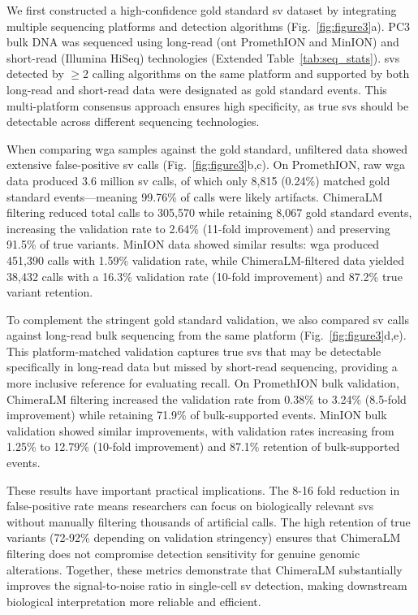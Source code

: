 \documentclass[pdflatex,sn-nature,lineno]{sn-jnl}%
\theoremstyle{thmstyleone}%
\theoremstyle{thmstyletwo}%
\theoremstyle{thmstylethree}%
\begin{document}
We first constructed a high-confidence gold standard \gls{sv} dataset by integrating multiple sequencing platforms and detection algorithms (Fig.~\ref{fig:figure3}a).
PC3 bulk DNA was sequenced using long-read (\gls{ont} PromethION and MinION) and short-read (Illumina HiSeq) technologies (Extended Table~\ref{tab:seq_stats}).
\glspl{sv} detected by $\geq$2 calling algorithms on the same platform and supported by both long-read and short-read data were designated as gold standard events.
This multi-platform consensus approach ensures high specificity, as true \glspl{sv} should be detectable across different sequencing technologies.

When comparing \gls{wga} samples against the gold standard, unfiltered data showed extensive false-positive \gls{sv} calls (Fig.~\ref{fig:figure3}b,c).
On PromethION, raw \gls{wga} data produced 3.6 million \gls{sv} calls, of which only 8,815 (0.24\%) matched gold standard events—meaning 99.76\% of calls were likely artifacts.
ChimeraLM filtering reduced total calls to 305,570 while retaining 8,067 gold standard events, increasing the validation rate to 2.64\% (11-fold improvement) and preserving 91.5\% of true variants.
MinION data showed similar results: \gls{wga} produced 451,390 calls with 1.59\% validation rate, while ChimeraLM-filtered data yielded 38,432 calls with a 16.3\% validation rate (10-fold improvement) and 87.2\% true variant retention.

To complement the stringent gold standard validation, we also compared \gls{sv} calls against long-read bulk sequencing from the same platform (Fig.~\ref{fig:figure3}d,e).
This platform-matched validation captures true \glspl{sv} that may be detectable specifically in long-read data but missed by short-read sequencing, providing a more inclusive reference for evaluating recall.
On PromethION bulk validation, ChimeraLM filtering increased the validation rate from 0.38\% to 3.24\% (8.5-fold improvement) while retaining 71.9\% of bulk-supported events.
MinION bulk validation showed similar improvements, with validation rates increasing from 1.25\% to 12.79\% (10-fold improvement) and 87.1\% retention of bulk-supported events.

These results have important practical implications.
The 8-16 fold reduction in false-positive rate means researchers can focus on biologically relevant \glspl{sv} without manually filtering thousands of artificial calls.
The high retention of true variants (72-92\% depending on validation stringency) ensures that ChimeraLM filtering does not compromise detection sensitivity for genuine genomic alterations. Together, these metrics demonstrate that ChimeraLM substantially improves the signal-to-noise ratio in single-cell \gls{sv} detection, making downstream biological interpretation more reliable and efficient.
\end{document}
